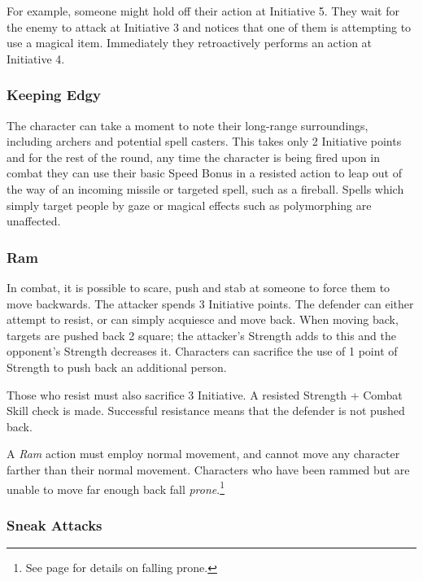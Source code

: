 \documentclass[titlepage,a4paper,openany]{book}
\begin{document}
\begin{multicols}{2}
For example, someone might hold off their action at Initiative 5. They wait for the enemy to attack at Initiative 3 and notices that one of them is attempting to use a magical item. Immediately they retroactively performs an action at Initiative 4.

\subsubsection{Keeping Edgy}\label{edgy}

The character can take a moment to note their long-range surroundings, including archers and potential spell casters. This takes only 2 Initiative points and for the rest of the \gls{round}, any time the character is being fired upon in combat they can use their basic Speed Bonus in a resisted action to leap out of the way of an incoming missile or targeted spell, such as a fireball. Spells which simply target people by gaze or magical effects such as polymorphing are unaffected.

\subsubsection{Ram}

In combat, it is possible to scare, push and stab at someone to force them to move backwards. The attacker spends 3 Initiative points. The defender can either attempt to resist, or can simply acquiesce and move back. When moving back, targets are pushed back 2 square; the attacker's Strength adds to this and the opponent's Strength decreases it. Characters can sacrifice the use of 1 point of Strength to push back an additional person.

Those who resist must also sacrifice 3 Initiative. A resisted Strength + Combat Skill check is made. Successful resistance means that the defender is not pushed back.

A \textit{Ram} action must employ normal movement, and cannot move any character farther than their normal movement.  Characters who have been rammed but are unable to move far enough back fall \textit{prone}.\footnote{See page \pageref{prone} for details on falling prone.}

\subsubsection{Sneak Attacks}\label{sneakattack}


\end{multicols}
\end{document}
